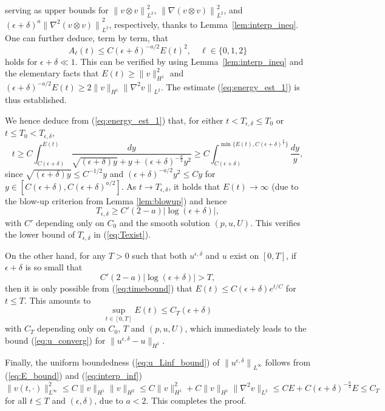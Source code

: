 \documentclass[reqno,10pt]{amsart}
\theoremstyle{definition}
\theoremstyle{remark}
\numberwithin{equation}{section}
\begin{document}
serving as upper bounds for ${\|v\otimes v\|}_{L^2}^2$, ${\| \nabla (v\otimes v)\|}_{L^2}^2$, and $(\epsilon+\delta)^a {\| \nabla^2 (v\otimes v)\|}_{L^2}^2$, respectively, thanks to Lemma~\ref{lem:interp_ineq}. One can further deduce, term by term, that
\[ A_\ell(t) \le C (\epsilon+\delta)^{-a/2} E(t)^2, \quad \ell \in \{0,1,2\} \]
holds for $\epsilon+\delta\ll 1$. This can be verified by using Lemma~\ref{lem:interp_ineq} and the elementary facts that $E(t)\ge \|v\|_{H^1}^2$ and $(\epsilon+\delta)^{-a/2}E(t)\ge 2\|v\|_{H^1} {\| \nabla^2 v\|}_{L^2}$. The estimate (\ref{eq:energy_est_1}) is thus established.

We hence deduce from (\ref{eq:energy_est_1}) that, for either $t<T_{\epsilon,\delta}\le T_0$ or $t\le T_0<T_{\epsilon,\delta}$, 
\begin{equation} \label{eq:timebound}
    t \ge C \int_{C(\epsilon+\delta)}^{E(t)} \frac{dy}{\sqrt{(\epsilon+\delta)y}+y+(\epsilon+\delta)^{-\frac{a}{2}}y^2}
    \ge C \int_{C(\epsilon+\delta)}^{\min\{E(t),C(\epsilon+\delta)^{\frac{a}{2}}\}} \frac{dy}{y},
\end{equation}
since $\sqrt{(\epsilon+\delta)y}\le C^{-1/2} y$ and $(\epsilon+\delta)^{-a/2}y^2 \le Cy$ for $y\in[C(\epsilon+\delta), C(\epsilon+\delta)^{a/2}]$. As $t\to T_{\epsilon,\delta}$, it holds that $E(t)\to\infty$ (due to the blow-up criterion from Lemma \ref{lem:blowup}) and hence
\[
    T_{\epsilon,\delta}\ge C'(2-a)|\log(\epsilon+\delta)|,
\]
with $C'$ depending only on $C_0$ and the smooth solution $(p,u,U)$. This verifies the lower bound of $T_{\epsilon,\delta}$ in (\ref{eq:Texist}). 
    
On the other hand, for any $T>0$ such that both $u^{\epsilon,\delta}$ and $u$ exist on $[0,T]$, if $\epsilon+\delta$ is so small that
\[
    C'(2-a)|\log (\epsilon+\delta)| > T,
\]
then it is only possible from (\ref{eq:timebound}) that $E(t)\le C(\epsilon+\delta) e^{t/C}$ for $t\le T$. This amounts to
\begin{equation} \label{eq:E_bound}
    \sup_{t\in[0,T]} E(t) \le C_T (\epsilon+\delta)
\end{equation}
with $C_T$ depending only on $C_0$, $T$ and $(p,u,U)$, which immediately leads to the bound (\ref{eq:u_converg}) for $\|u^{\epsilon,\delta}-u\|_{H^1}$. 
    
Finally, the uniform boundedness (\ref{eq:u_Linf_bound}) of ${\| u^{\epsilon,\delta}\|}_{L^\infty}$ follows from (\ref{eq:E_bound}) and (\ref{eq:interp_inf})
\[
    \|v(t,\cdot)\|_{L^\infty}^2 \le C\|v\|_{H^1} \|v\|_{H^2} \le C \|v\|_{H^1}^2 + C\|v\|_{H^1}\|\nabla^2 v\|_{L^2} \le CE+C(\epsilon+\delta)^{-\frac{a}{2}}E \le C_{T}
\]
for all $t\le T$ and $(\epsilon,\delta)$, due to $a<2$. This completes the proof.
\end{document}
